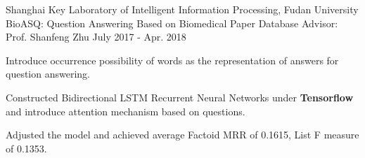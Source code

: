 \begin{cventries}
      \cventry
     {Shanghai Key Laboratory of Intelligent Information Processing, Fudan University} 
    {BioASQ: Question Answering Based on Biomedical Paper Database} %
    {Advisor: Prof. Shanfeng Zhu} %
    {July 2017 - Apr. 2018} %
    {
      \begin{cvitems} %
	\item {Introduce occurrence possibility of words as the representation of answers for question answering.}
	\item {Constructed Bidirectional LSTM Recurrent Neural Networks under \textbf{Tensorflow} and introduce attention mechanism based on questions.}
	\item {Adjusted the model and achieved average Factoid MRR of 0.1615, List F measure of 0.1353.}
      \end{cvitems}
    }

\end{cventries}
